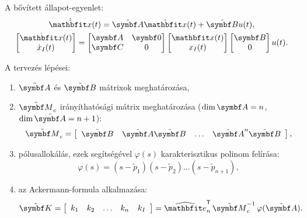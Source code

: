 A bővített állapot-egyenlet:
\begin{gather}
  \dot{\tvec x}(t) = \tmat A \tvec x(t) + \tmat B u(t)
  ,
  \\
  \begin{bmatrix}
    \dot{\rvec x}(t) \\ \dot x_I(t)
  \end{bmatrix} = \begin{bmatrix}
    \rmat A & \rmat 0 \\ \rmat C & 0
  \end{bmatrix} \begin{bmatrix}
    \rvec x(t) \\ x_I(t)
  \end{bmatrix} \begin{bmatrix}
    \rmat B \\ 0
  \end{bmatrix} u(t)
  .
\end{gather}

A tervezés lépései:
\bgroup
\def\arraystretch{1.2}
\begin{enumerate}[label={\color{darkRed}\theenumi})]
  \item $\tmat A$ és $\tmat B$ mátrixok meghatározása,
  \item $\tmat M_c$ irányíthatósági mátrix meghatározása ($\dim \rmat A = n$,
        $\dim \tmat A = n+1$):
        \begin{equation}
          \tmat M_c = \left[\begin{array}{ c : c : c : c }
              \tmat B         &
              \tmat A \tmat B &
              \dots           &
              \tmat A^{n} \tmat B
            \end{array}\right],
        \end{equation}
  \item pólusallokálás, ezek segítségével $\varphi(s)$ karakterisztikus polinom
        felírása:
        \begin{equation}
          \varphi(s) = (s - \tilde p_1)(s - \tilde p_2) \dots (s - \tilde p_{n+1}),
        \end{equation}
  \item az Ackermann-formula alkalmazása:
        \begin{equation}
          \tmat K = \left[\begin{array}{c c c c : c}
              k_1 & k_2 & \dots & k_n & k_I
            \end{array}\right]
          = \uvec e_n^\T
          \,\tmat M_c^{-1}
          \,\varphi({\tmat A}).
        \end{equation}
\end{enumerate}
\egroup

\clearpage
